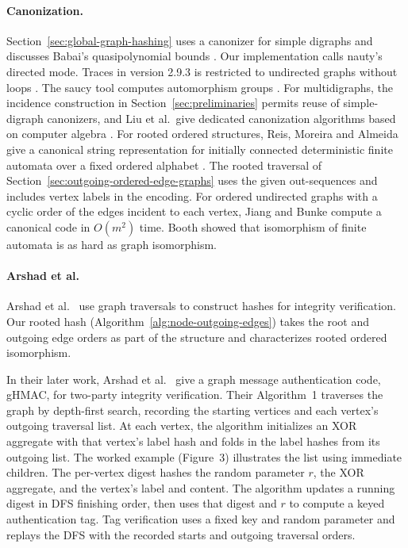 \documentclass[twoside,leqno]{article}
\begin{document}
\paragraph{Canonization.} Section~\ref{sec:global-graph-hashing} uses a canonizer for simple digraphs and discusses Babai's quasipolynomial bounds \cite{babai2016quasipolynomial,babai2019canonical}. Our implementation calls nauty's directed mode. Traces in version 2.9.3 is restricted to undirected graphs without loops \cite{nautyuserguide}. The saucy tool computes automorphism groups \cite{saucy}. For multidigraphs, the incidence construction in Section~\ref{sec:preliminaries} permits reuse of simple-digraph canonizers, and Liu et al.\ give dedicated canonization algorithms based on computer algebra \cite{liu2024multidigraph}. For rooted ordered structures, Reis, Moreira and Almeida give a canonical string representation for initially connected deterministic finite automata over a fixed ordered alphabet \cite{reis2005representation}. The rooted traversal of Section~\ref{sec:outgoing-ordered-edge-graphs} uses the given out-sequences and includes vertex labels in the encoding. For ordered undirected graphs with a cyclic order of the edges incident to each vertex, Jiang and Bunke \cite{jiang1998coding,jiang1999optimal} compute a canonical code in $O(m^2)$ time. Booth \cite{booth1978isomorphism} showed that isomorphism of finite automata is as hard as graph isomorphism.

\paragraph{Arshad et al.} Arshad et al.\ \cite{Arshad2014-cc} use graph traversals to construct hashes for integrity verification. Our rooted hash (Algorithm~\ref{alg:node-outgoing-edges}) takes the root and outgoing edge orders as part of the structure and characterizes rooted ordered isomorphism.

In their later work, Arshad et al.\ \cite{Arshad2018-ij} give a graph message authentication code, gHMAC, for two-party integrity verification. Their Algorithm~1 traverses the graph by depth-first search, recording the starting vertices and each vertex's outgoing traversal list. At each vertex, the algorithm initializes an XOR aggregate with that vertex's label hash and folds in the label hashes from its outgoing list. The worked example (Figure~3) illustrates the list using immediate children. The per-vertex digest hashes the random parameter $r$, the XOR aggregate, and the vertex's label and content. The algorithm updates a running digest in DFS finishing order, then uses that digest and $r$ to compute a keyed authentication tag. Tag verification uses a fixed key and random parameter and replays the DFS with the recorded starts and outgoing traversal orders.
\end{document}
